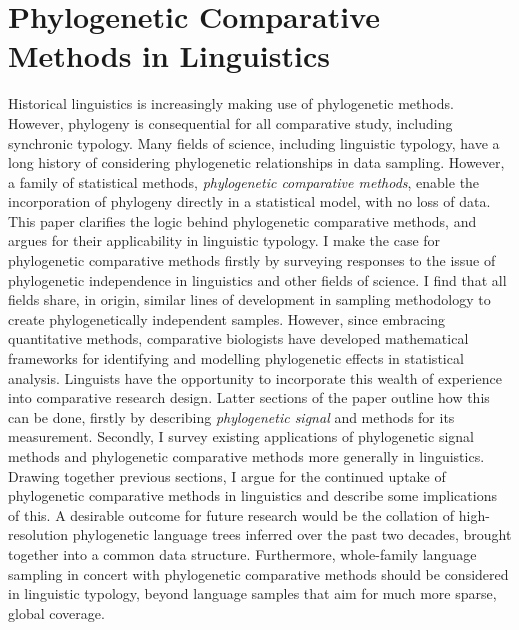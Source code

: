 \chapter[Phylogenetic Comparative Methods]{Phylogenetic Comparative Methods in Linguistics}
\label{Chap:pcms-in-ling}	%
\pagestyle{headings}


Historical linguistics is increasingly making use of phylogenetic methods. However, phylogeny is consequential for all comparative study, including synchronic typology. Many fields of science, including linguistic typology, have a long history of considering phylogenetic relationships in data sampling. However, a family of statistical methods, \emph{phylogenetic comparative methods}, enable the incorporation of phylogeny directly in a statistical model, with no loss of data. This paper clarifies the logic behind phylogenetic comparative methods, and argues for their applicability in linguistic typology. I make the case for phylogenetic comparative methods firstly by surveying responses to the issue of phylogenetic independence in linguistics and other fields of science. I find that all fields share, in origin, similar lines of development in sampling methodology to create phylogenetically independent samples. However, since embracing quantitative methods, comparative biologists have developed mathematical frameworks for identifying and modelling phylogenetic effects in statistical analysis. Linguists have the opportunity to incorporate this wealth of experience into comparative research design. Latter sections of the paper outline how this can be done, firstly by describing \emph{phylogenetic signal} and methods for its measurement. Secondly, I survey existing applications of phylogenetic signal methods and phylogenetic comparative methods more generally in linguistics. Drawing together previous sections, I argue for the continued uptake of phylogenetic comparative methods in linguistics and describe some implications of this. A desirable outcome for future research would be the collation of high-resolution phylogenetic language trees inferred over the past two decades, brought together into a common data structure. Furthermore, whole-family language sampling in concert with phylogenetic comparative methods should be considered in linguistic typology, beyond language samples that aim for much more sparse, global coverage.



